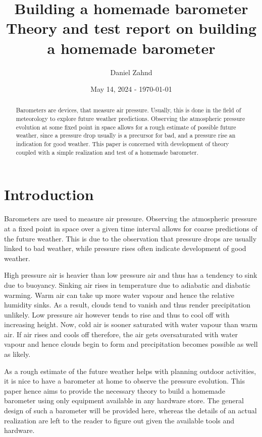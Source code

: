 \documentclass[a4paper,11pt, twocolumn]{article}
\author{Daniel Zahnd}
\date{May 14, 2024 - \today}
\title{Building a homemade barometer \\ \vspace{0.5cm} \normalsize Theory and test report on building a homemade barometer}
\begin{document}
\maketitle


\begin{abstract}
Barometers are devices, that measure air pressure. Usually, this is done in the field of meteorology to explore future weather predictions. Observing the atmospheric pressure evolution at some fixed point in space allows for a rough estimate of possible future weather, since a pressure drop usually is a precursor for bad, and a pressure rise an indication for good weather. This paper is concerned with development of theory coupled with a simple realization and test of a homemade barometer.
\end{abstract}

\section{Introduction}
Barometers are used to measure air pressure. Observing the atmospheric pressure at a fixed point in space over a given time interval allows for coarse predictions of the future weather. This is due to the observation that pressure drops are usually linked to bad weather, while pressure rises often indicate development of good weather. 

High pressure air is heavier than low pressure air and thus has a tendency to sink due to buoyancy. Sinking air rises in temperature due to adiabatic and diabatic warming. Warm air can take up more water vapour and hence the relative humidity sinks. As a result, clouds tend to vanish and thus render precipitation unlikely. Low pressure air however tends to rise and thus to cool off with increasing height. Now, cold air is sooner saturated with water vapour than warm air. If air rises and cools off therefore, the air gets oversaturated with water vapour and hence clouds begin to form and precipitation becomes possible as well as likely.

As a rough estimate of the future weather helps with planning outdoor activities, it is nice to have a barometer at home to observe the pressure evolution. This paper hence aims to provide the necessary theory to build a homemade barometer using only equipment available in any hardware store. The general design of such a barometer will be provided here, whereas the details of an actual realization are left to the reader to figure out given the available tools and hardware.
\end{document}
